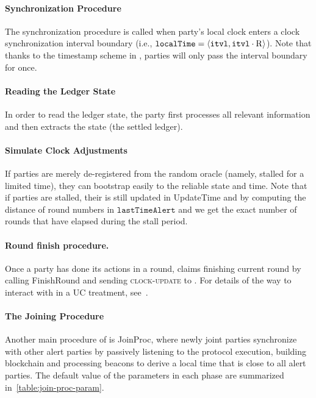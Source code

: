 

\paragraph{Synchronization Procedure}
%
The synchronization procedure is called when party's local clock enters a clock synchronization interval boundary (i.e., $\mathtt{localTime} = \langle \mathtt{itvl}, \mathtt{itvl} \cdot \mathrm{R} \rangle$).
%
Note that thanks to the timestamp scheme in \timekeeper, parties will only pass the interval boundary for once.



\paragraph{Reading the Ledger State}
%
In order to read the ledger state, the party \party first processes all relevant information and then extracts the state (the settled ledger).



\paragraph{Simulate Clock Adjustments}
%
If parties are merely de-registered from the random oracle \funcRO (namely, stalled for a limited time), they can bootstrap easily to the reliable state and time.
%
Note that if parties are stalled, their \localTime is still updated in \textsf{UpdateTime} and by computing the distance of round numbers in $\mathtt{lastTimeAlert}$ and \localTime we get the exact number of rounds that have elapsed during the stall period.



\paragraph{Round finish procedure.}
%
Once a party \party has done its actions in a round, \party claims finishing current round by calling \textsf{FinishRound} and sending \textsc{clock-update} to \funcImpClock.
%
For details of the way to interact with \funcImpClock in a UC treatment, see~\cite{EC:BGKRZ21}.



\paragraph{The Joining Procedure}
%
Another main procedure of \timekeeper is \textsf{JoinProc}, where newly joint parties synchronize with other alert parties by passively listening to the protocol execution, building blockchain and processing beacons to derive a local time that is close to all alert parties.
%
The default value of the parameters in each phase are summarized in~\cref{table:join-proc-param}.



